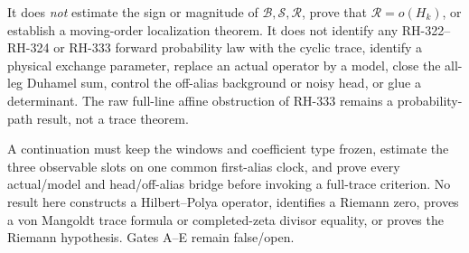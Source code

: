 \documentclass[11pt]{article}
\theoremstyle{remark}
\newcommand{\cB}{\mathcal B}
\newcommand{\cR}{\mathcal R}
\newcommand{\cS}{\mathcal S}
\begin{document}
It does \emph{not} estimate the sign or magnitude of $\cB,\cS,\cR$, prove
that $\cR=o(H_k)$, or establish a moving-order localization theorem.  It does
not identify any RH-322--RH-324 or RH-333 forward probability law with the
cyclic trace, identify a physical exchange parameter, replace an actual
operator by a model, close the all-leg Duhamel sum, control the off-alias
background or noisy head, or glue a determinant.  The raw full-line affine
obstruction of RH-333 remains a probability-path result, not a trace theorem.

A continuation must keep the windows and coefficient type frozen, estimate
the three observable slots on one common first-alias clock, and prove every
actual/model and head/off-alias bridge before invoking a full-trace criterion.
No result here constructs a Hilbert--Polya operator, identifies a Riemann
zero, proves a von Mangoldt trace formula or completed-zeta divisor equality,
or proves the Riemann hypothesis.  Gates A--E remain false/open.



\end{document}
